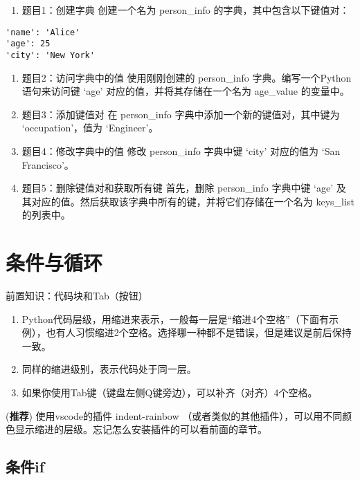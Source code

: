 \documentclass[
  letterpaper,
  DIV=11,
  numbers=noendperiod]{scrreprt}
\providecommand{\tightlist}{%
  \setlength{\itemsep}{0pt}\setlength{\parskip}{0pt}}\usepackage{longtable,booktabs,array}
\begin{document}
\begin{enumerate}
\def\labelenumi{\arabic{enumi}.}
\tightlist
\item
  题目1：创建字典 创建一个名为 person\_info 的字典，其中包含以下键值对：
\end{enumerate}

\begin{verbatim}
'name': 'Alice'
'age': 25
'city': 'New York'
\end{verbatim}

\begin{enumerate}
\def\labelenumi{\arabic{enumi}.}
\setcounter{enumi}{1}
\item
  题目2：访问字典中的值 使用刚刚创建的 person\_info
  字典。编写一个Python语句来访问键 `age' 对应的值，并将其存储在一个名为
  age\_value 的变量中。
\item
  题目3：添加键值对 在 person\_info 字典中添加一个新的键值对，其中键为
  `occupation'，值为 `Engineer'。
\item
  题目4：修改字典中的值 修改 person\_info 字典中键 `city' 对应的值为
  `San Francisco'。
\item
  题目5：删除键值对和获取所有键 首先，删除 person\_info 字典中键 `age'
  及其对应的值。然后获取该字典中所有的键，并将它们存储在一个名为
  keys\_list 的列表中。
\end{enumerate}

\hypertarget{ux6761ux4ef6ux4e0eux5faaux73af}{%
\chapter{条件与循环}\label{ux6761ux4ef6ux4e0eux5faaux73af}}

前置知识：代码块和Tab（按钮）

\begin{enumerate}
\def\labelenumi{\arabic{enumi}.}
\tightlist
\item
  Python代码层级，用缩进来表示，一般每一层是``缩进4个空格''（下面有示例），也有人习惯缩进2个空格。选择哪一种都不是错误，但是建议是前后保持一致。
\item
  同样的缩进级别，表示代码处于同一层。
\item
  如果你使用Tab键（键盘左侧Q键旁边），可以补齐（对齐）4个空格。
\end{enumerate}

(\textbf{推荐}) 使用vscode的插件 indent-rainbow
（或者类似的其他插件），可以用不同颜色显示缩进的层级。忘记怎么安装插件的可以看前面的章节。

\hypertarget{ux6761ux4ef6if}{%
\section{条件if}\label{ux6761ux4ef6if}}
\end{document}
